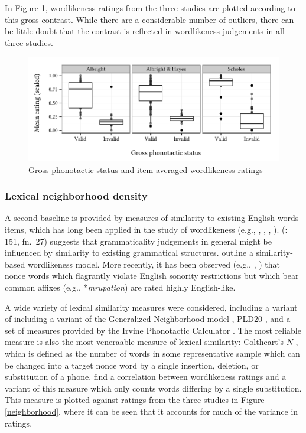 In Figure \ref{boxplot}, wordlikeness ratings from the three studies are plotted according to this gross contrast. While there are a considerable number of outliers, there can be little doubt that the contrast is reflected in wordlikeness judgements in all three studies.

\begin{figure}
\centering
\includegraphics{boxplot.pdf}
\caption{Gross phonotactic status and item-averaged wordlikeness ratings}
\label{boxplot}
\end{figure}

\subsubsection{Lexical neighborhood density}

A second baseline is provided by measures of similarity to existing English words items, which has long been applied in the study of wordlikeness (e.g., \citealt{Greenberg1964}, \citealt{Ohala1986b}, \citealt{Shademan2006,Shademan2007}, \citealt{Vitevitch1998,Vitevitch1999a}). \citeauthor{LSLT} (\citeyear{LSLT}: 151, fn.~27) suggests that grammaticality judgements in general might be influenced by similarity to existing grammatical structures. \citet[417f.]{SPE} outline a similarity-based wordlikeness model. More recently, it has been observed (e.g., \citealt[51]{Coleman1997}, \citealt{Hay2004a}) that nonce words which flagrantly violate English sonority restrictions but which bear common affixes (e.g., *\emph{mrupation}) are rated highly English-like.

A wide variety of lexical similarity measures were considered, including a variant of including a variant of the Generalized Neighborhood model \citep{Bailey2001}, PLD20 \citep{Suarez2011}, and a set of measures provided by the Irvine Phonotactic Calculator \citep{Vaden2009}. The most reliable measure is also the most veneraable measure of lexical similarity: Coltheart's $N$ \citep{Coltheart1977}, which is defined as the number of words in some representative sample which can be changed into a target nonce word by a single insertion, deletion, or substitution of a phone. \citet{Greenberg1964} find a correlation between wordlikeness ratings and a variant of this measure which only counts words differing by a single substitution. This measure is plotted against ratings from the three studies in Figure \ref{neighborhood}, where it can be seen that it accounts for much of the variance in ratings.

